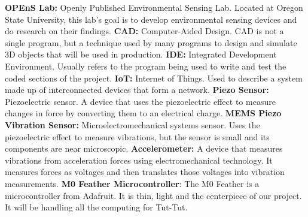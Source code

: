 \documentclass[letterpaper,10pt,draftclsnofoot,onecolumn]{article}
\begin{document}
\quad \newline
\textbf{OPEnS Lab:} Openly Published Environmental Sensing Lab. Located at Oregon State University, this lab's goal is to develop environmental sensing devices and do research on their findings.
\newline
\newline
\textbf{CAD:} Computer-Aided Design. CAD is not a single program, but a technique used by many programs to design and simulate 3D objects that will be used in production.
\newline
\newline
\textbf{IDE:} Integrated Development Environment. Usually refers to the program being used to write and test the coded sections of the project.
\newline
\newline
\textbf{IoT:} Internet of Things. Used to describe a system made up of interconnected devices that form a network.
\newline
\newline
\textbf{Piezo Sensor:} Piezoelectric sensor. A device that uses the piezoelectric effect to measure changes in force by converting them to an electrical charge.
\newline
\newline
\textbf{MEMS Piezo Vibration Sensor:} Microelectromechanical systems sensor. Uses the piezoelectric effect to measure vibrations, but the sensor is small and its components are near microscopic.
\newline
\newline
\textbf{Accelerometer:} A device that measures vibrations from acceleration forces using electromechanical technology. It measures forces as voltages and then translates those voltages into vibration measurements.
\newline
\newline
\textbf{M0 Feather Microcontroller}: The M0 Feather is a microcontroller from Adafruit. It is thin, light and the centerpiece of our project. It will be handling all the computing for Tut-Tut.

\pagebreak
\end{document}
